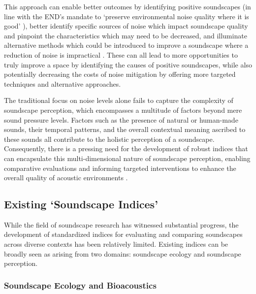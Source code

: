 \documentclass[
  authoryear,
  preprint,
  3p]{elsarticle}
\begin{document}
This approach can enable better outcomes by identifying positive
soundscapes (in line with the END's mandate to `preserve environmental
noise quality where it is good' \citep{EuropeanUnion2002Directive}),
better identify specific sources of noise which impact soundscape
quality and pinpoint the characteristics which may need to be decreased,
and illuminate alternative methods which could be introduced to improve
a soundscape where a reduction of noise is impractical
\citep{Fiebig2018Does, Kang2018Impact}. These can all lead to more
opportunities to truly improve a space by identifying the causes of
positive soundscapes, while also potentially decreasing the costs of
noise mitigation by offering more targeted techniques and alternative
approaches.

The traditional focus on noise levels alone fails to capture the
complexity of soundscape perception, which encompasses a multitude of
factors beyond mere sound pressure levels. Factors such as the presence
of natural or human-made sounds, their temporal patterns, and the
overall contextual meaning ascribed to these sounds all contribute to
the holistic perception of a soundscape. Consequently, there is a
pressing need for the development of robust indices that can encapsulate
this multi-dimensional nature of soundscape perception, enabling
comparative evaluations and informing targeted interventions to enhance
the overall quality of acoustic environments \citep{Chen2023Developing}.

\subsection{Existing `Soundscape
Indices'}\label{existing-soundscape-indices}

While the field of soundscape research has witnessed substantial
progress, the development of standardized indices for evaluating and
comparing soundscapes across diverse contexts has been relatively
limited. Existing indices can be broadly seen as arising from two
domains: soundscape ecology and soundscape perception.

\subsubsection{Soundscape Ecology and
Bioacoustics}\label{soundscape-ecology-and-bioacoustics}
\end{document}
